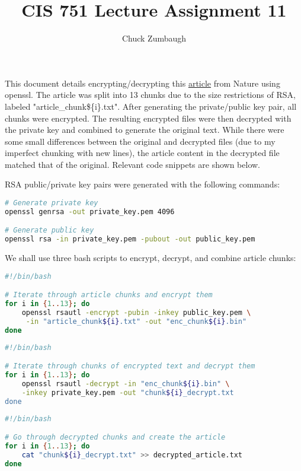\documentclass[12pt]{article}
\title{CIS 751 Lecture Assignment 11}
\author{Chuck Zumbaugh}
\begin{document}
\maketitle

This document details encrypting/decrypting this \href{https://www.nature.com/articles/d41586-024-01555-x}{article} from Nature using openssl. The article was split into 13 chunks due to the size restrictions of RSA, labeled "article\_chunk\$\{i\}.txt". After generating the private/public key pair, all chunks were encrypted. The resulting encrypted files were then decrypted with the private key and combined to generate the original text. While there were some small differences between the original and decrypted files (due to my imperfect chunking with new lines), the article content in the decrypted file matched that of the original. Relevant code snippets are shown below.
\bigbreak

RSA public/private key pairs were generated with the following commands:

\begin{lstlisting}[language=bash]
# Generate private key
openssl genrsa -out private_key.pem 4096

# Generate public key
openssl rsa -in private_key.pem -pubout -out public_key.pem
\end{lstlisting}

We shall use three bash scripts to encrypt, decrypt, and combine article chunks:

\begin{lstlisting}[language=bash]
#!/bin/bash

# Iterate through article chunks and encrypt them
for i in {1..13}; do
	openssl rsautl -encrypt -pubin -inkey public_key.pem \
	 -in "article_chunk${i}.txt" -out "enc_chunk${i}.bin"
done
\end{lstlisting}

\begin{lstlisting}[language=bash]
#!/bin/bash

# Iterate through chunks of encrypted text and decrypt them
for i in {1..13}; do
	openssl rsautl -decrypt -in "enc_chunk${i}.bin" \
	-inkey private_key.pem -out "chunk${i}_decrypt.txt
done
\end{lstlisting}

\begin{lstlisting}[language=bash]
#!/bin/bash

# Go through decrypted chunks and create the article
for i in {1..13}; do
	cat "chunk${i}_decrypt.txt" >> decrypted_article.txt
done
\end{lstlisting}
\end{document}
